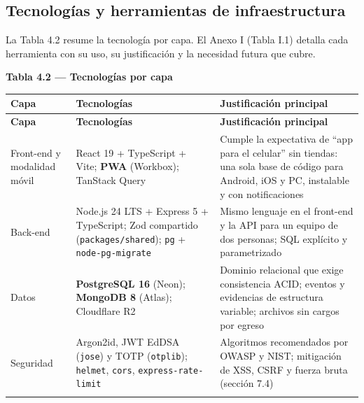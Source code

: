 \documentclass[11pt,a4paper]{article}
\begin{document}
\subsection{Tecnologías y herramientas de infraestructura}

La Tabla 4.2 resume la tecnología por capa. El Anexo I (Tabla I.1) detalla cada herramienta con su uso, su justificación y la necesidad futura que cubre.

\textbf{Tabla 4.2 --- Tecnologías por capa}\nopagebreak

\begingroup
\begin{longtable}{@{}>{\raggedright\arraybackslash\hspace{0pt}}p{}>{\raggedright\arraybackslash\hspace{0pt}}p{}>{\raggedright\arraybackslash\hspace{0pt}}p{}@{}}
\toprule
\textbf{Capa} & \textbf{Tecnologías} & \textbf{Justificación principal} \\ \midrule
\endfirsthead
\toprule
\textbf{Capa} & \textbf{Tecnologías} & \textbf{Justificación principal} \\ \midrule
\endhead
\bottomrule
\endlastfoot
Front-end y modalidad móvil & React 19 + TypeScript + Vite; \textbf{PWA} (Workbox); TanStack Query & Cumple la expectativa de ``app para el celular'' sin tiendas: una sola base de código para Android, iOS y PC, instalable y con notificaciones \\ \addlinespace[0.25em]
\mbox{Back-end} & Node.js 24 LTS + Express 5 + TypeScript; Zod compartido (\texttt{packages/\allowbreak{}shared}); \texttt{pg} + \texttt{node-{}\allowbreak{}pg-{}\allowbreak{}migrate} & Mismo lenguaje en el front-end y la API para un equipo de dos personas; SQL explícito y parametrizado \\ \addlinespace[0.25em]
\mbox{Datos} & \textbf{PostgreSQL 16} (Neon); \textbf{MongoDB 8} (Atlas); Cloudflare R2 & Dominio relacional que exige consistencia ACID; eventos y evidencias de estructura variable; archivos sin cargos por egreso \\ \addlinespace[0.25em]
\mbox{Seguridad} & Argon2id, JWT EdDSA (\texttt{jose}) y TOTP (\texttt{otplib}); \texttt{helmet}, \texttt{cors}, \texttt{express-{}\allowbreak{}rate-{}\allowbreak{}limit} & Algoritmos recomendados por OWASP y NIST; mitigación de XSS, CSRF y fuerza bruta (sección 7.4) \\ \addlinespace[0.25em]

\end{longtable}
\end{document}
